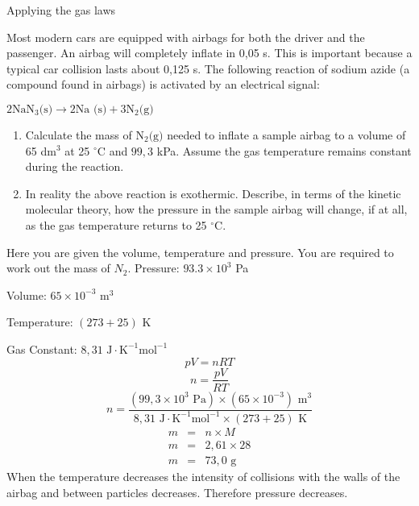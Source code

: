 \begin{wex}{Applying the gas laws}{Most modern cars are equipped with airbags for both the driver and the passenger. An airbag will completely inflate in 0,05 s. This is important because a typical car collision lasts about 0,125 s. The following reaction of sodium azide (a compound found in airbags) is activated by an electrical signal:
\begin{center}
$2\text{NaN}_3\text{(s)} \rightarrow 2\text{Na (s)} + 3\text{N}_2\text{(g)}$
\end{center}
\begin{enumerate}
\item Calculate the mass of $\text{N}_2\text{(g)}$ needed to inflate a sample airbag to a volume of 65 dm$^3$ at 25 $^{\circ}$C and $99,3$ kPa. Assume the gas temperature remains constant during the reaction.
\item In reality the above reaction is exothermic. Describe, in terms of the kinetic molecular theory, how the pressure in the sample airbag will change, if at all, as the gas temperature returns to 25 $^{\circ}$C.
\end{enumerate} }{
Here you are given the volume, temperature and pressure. You are required to work out the mass of $N_2$.
Pressure: $93.3 \times 10^3$ Pa

Volume: $65 \times 10^{-3}$ m$^{3}$

Temperature: $(273+25)$ K

Gas Constant: $8,31 \text{ J} \cdot \text{K}^{-1} \text{mol}^{-1}$
\begin{equation*}
pV = nRT
\end{equation*}
\begin{equation*}
n=\frac{pV}{RT}
\end{equation*}
\begin{equation*}
n=\frac{(99,3 \times 10^3 \text{ Pa}) \times (65 \times 10^{-3}) \text{ m}^{3} } {8,31 \text{ J} \cdot \text{K}^{-1} \text{mol}^{-1} \times (273 + 25 ) \text{ K} }
\end{equation*}
\begin{eqnarray*}
m &=& n \times M\\
m &=& 2,61 \times 28\\
m &=& 73,0 \text{ g}
\end{eqnarray*}
When the temperature decreases the intensity of collisions with the walls of the airbag and between particles decreases. Therefore pressure decreases.
}
\end{wex}



